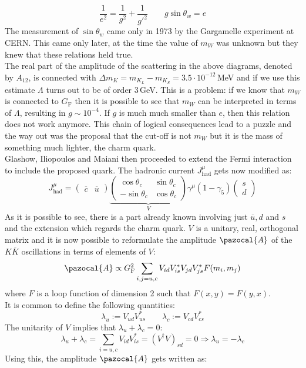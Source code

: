 \documentclass[../main.tex]{subfiles}
\begin{document}
\[
\frac{1}{e^2}=\frac{1}{g^2}+\frac{1}{g'^2} \qquad g\sin\theta_w=e
\]
The measurement of $\sin\theta_w$ came only in 1973 by the Gargamelle experiment at CERN. This came only later, at the time the value of $m_W$ was unknown but they knew that these relations held true.\\
The real part of the amplitude of the scattering in the above diagrams, denoted by $A_{12}$, is connected with $\Delta m_K=m_{K_L}-m_{K_S}=3.5\cdot10^{-12}$\,MeV and if we use this estimate $\Lambda$ turns out to be of order 3\,GeV. This is a problem: if we know that $m_W$ is connected to $G_{\text{F}}$ then it is possible to see that $m_W$ can be interpreted in terms of $\Lambda$, resulting in $g\sim10^{-4}$. If $g$ is much much smaller than $e$, then this relation does not work anymore. This chain of logical consequences lead to a puzzle and the way out was the proposal that the cut-off is not $m_W$ but it is the mass of something much lighter, the charm quark.\\
Glashow, Iliopoulos and Maiani then proceeded to extend the Fermi interaction to include the  proposed quark. The hadronic current $J^\mu_{\text{had}}$ gets now modified as:
\[
J^\mu_{\text{had}}=\begin{pmatrix}
    \overline{c} & \overline{u}
\end{pmatrix}\underbrace{\begin{pmatrix}
    \cos\theta_c & \sin\theta_c\\
    -\sin\theta_c & \cos\theta_c
\end{pmatrix}}_{V}\gamma^\mu(1-\gamma_5)\begin{pmatrix}
    s\\d
\end{pmatrix}
\]
As it is possible to see, there is a part already known involving just $\overline{u}, d$ and $s$ and the extension which regards the charm quark. $V$ is a unitary, real, orthogonal matrix and it is now possible to reformulate the amplitude $\pazocal{A}$ of the $K\overline{K}$ oscillations in terms of elements of $V$:
\[
\pazocal{A}\propto G_{\text{F}}^2\sum_{i,j=u,c}V_{id}V_{is}^*V_{jd}V_{js}^*F(m_i,m_j)
\]
where $F$ is a loop function of dimension 2 such that $F(x,y)=F(y,x)$.\\
It is common to define the following quantities:
\[
\lambda_u:=V_{ud}V_{us}^* \qquad \lambda_c:=V_{cd}V_{cs}^*
\]
The unitarity of $V$ implies that $\lambda_u+\lambda_c=0$:
\[
\lambda_u+\lambda_c=\sum_{i=u,c}V_{id}V_{is}^*=(V^\dagger V)_{sd}=0\Rightarrow\lambda_u=-\lambda_c
\]
Using this, the amplitude $\pazocal{A}$ gets written as:
\end{document}
